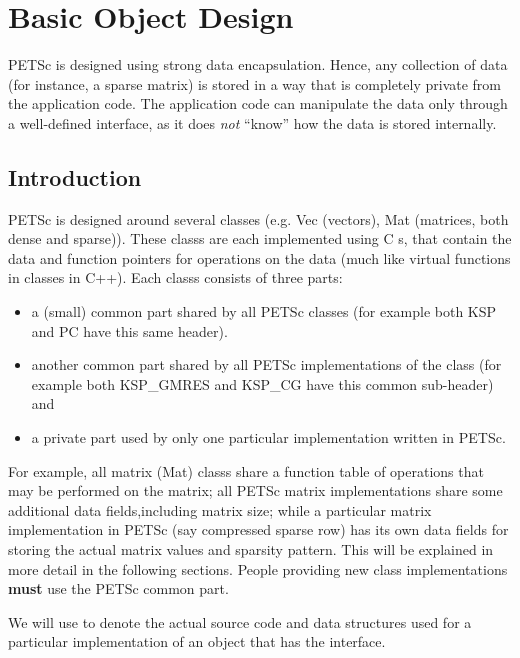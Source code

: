 \documentclass[twoside,12pt]{../sty/report_petsc}
\begin{document}
\chapter{Basic Object Design}
\label{chapter:design}


PETSc is designed using strong data encapsulation.  Hence,
any collection of data (for instance, a sparse matrix) is stored in
a way that is completely private from the application code. The application
code can manipulate the data only through a well-defined interface, as it
does {\em not} ``know'' how the data is stored internally.

\section{Introduction}

PETSc is designed around several classes (e.g. Vec (vectors),
Mat (matrices, both dense and sparse)). These classs are each
implemented using C s, that contain the data and function pointers
for operations on the data (much like virtual functions in classes in C++).
Each classs consists of three parts:
\begin{itemize}
\item a (small) common part shared by all PETSc classes (for example both KSP and PC have this same header).
\item another common part shared by all PETSc implementations of the class (for example both KSP\_GMRES and KSP\_CG have this common sub-header) and
\item a private part used by only one particular implementation written in PETSc.
\end{itemize}
For example, all matrix (Mat) classs share a function table of operations that
may be performed on the matrix; all PETSc matrix implementations share some additional
data fields,including matrix size; while a particular matrix implementation in PETSc
(say compressed sparse row) has its own data fields for storing the actual
matrix values and sparsity pattern. This will be explained in more detail
in the following sections. People providing new class implementations {\bf must}
use the PETSc common part.


We will use  to denote the actual source code and
data structures used for a particular implementation of an object that has the
 interface.
\end{document}
